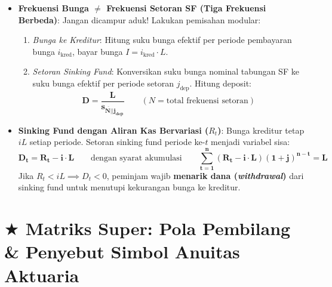 \documentclass[10pt,a4paper]{article}
\newcommand{\angl}[1]{\overline{#1|}}
\begin{document}
\begin{jebakanbox}
\begin{itemize}[leftmargin=1.5em, topsep=1.5pt, itemsep=2pt]
    \item \textbf{Frekuensi Bunga $\ne$ Frekuensi Setoran SF (Tiga Frekuensi Berbeda)}:
    Jangan dicampur aduk! Lakukan pemisahan modular:
    \begin{enumerate}[leftmargin=1.2em, topsep=1pt]
        \item \textit{Bunga ke Kreditur}: Hitung suku bunga efektif per periode pembayaran bunga $i_{\text{kred}}$, bayar bunga $I = i_{\text{kred}} \cdot L$.
        \item \textit{Setoran Sinking Fund}: Konversikan suku bunga nominal tabungan SF ke suku bunga efektif per periode setoran $j_{\text{dep}}$. Hitung deposit:
        \begin{equation*}
            \mathbf{D = \frac{L}{s_{\angl{N}|j_{\text{dep}}}}} \qquad (N = \text{total frekuensi setoran})
        \end{equation*}
    \end{enumerate}
    \item \textbf{Sinking Fund dengan Aliran Kas Bervariasi ($R_t$)}:
    Bunga kreditur tetap $i L$ setiap periode. Setoran sinking fund periode ke-$t$ menjadi variabel sisa:
    \begin{equation*}
        \mathbf{D_t = R_t - i \cdot L} \qquad\text{dengan syarat akumulasi}\qquad \mathbf{\sum_{t=1}^n (R_t - i \cdot L)(1+j)^{n-t} = L}
    \end{equation*}
    Jika $R_t < i L \implies D_t < 0$, peminjam wajib \textbf{menarik dana (\textit{withdrawal})} dari sinking fund untuk menutupi kekurangan bunga ke kreditur.
\end{itemize}
\end{jebakanbox}

\section*{\large $\bigstar$ Matriks Super: Pola Pembilang \& Penyebut Simbol Anuitas Aktuaria}
\end{document}
